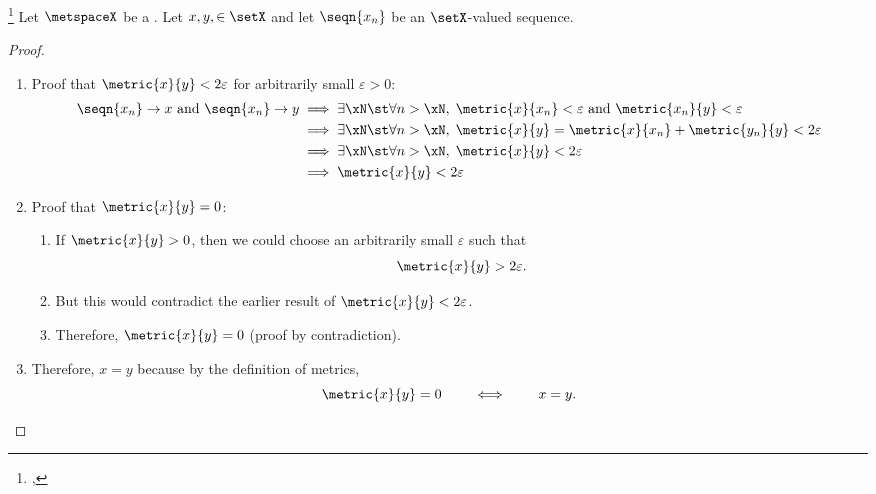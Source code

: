 \begin{theorem}
\label{thm:xn_to_xy}
\footnote{
  ,
  }
Let $\metspaceX$ be a .
Let $x,y,\in \setX$ and let $\seqn{x_n}$ be an $\setX$-valued sequence.
\end{theorem}
\begin{proof}
  \begin{enumerate}
    \item Proof that $\metric{x}{y} <2\varepsilon$ for arbitrarily small $\varepsilon>0$:
      \begin{align*}
        \seqn{x_n} \to x \text{ and }  \seqn{x_n} \to y
          &\implies \exists\xN \st \forall n>\xN,\;  \metric{x}{x_n}<\varepsilon \text{ and }  \metric{x_n}{y}<\varepsilon
        \\&\implies \exists\xN \st \forall n>\xN,\;  \metric{x}{y} = \metric{x}{x_n}+\metric{y_n}{y}<2\varepsilon 
        \\&\implies \exists\xN \st \forall n>\xN,\;  \metric{x}{y} <2\varepsilon 
        \\&\implies \metric{x}{y} <2\varepsilon 
      \end{align*}
  
    \item Proof that $\metric{x}{y}=0$:
      \begin{enumerate}
        \item If $\metric{x}{y}>0$, then we could choose an arbitrarily small $\varepsilon$ such that
          \[ \metric{x}{y} >2\varepsilon.\]
        \item But this would contradict the earlier result of $\metric{x}{y} <2\varepsilon$.
        \item Therefore, $\metric{x}{y}=0$ (proof by contradiction).
      \end{enumerate}
  
    \item Therefore, $x=y$ because by the definition of metrics, 
      \[ \metric{x}{y}=0 \qquad\iff\qquad x=y.\]
  
  \end{enumerate}
\end{proof}


